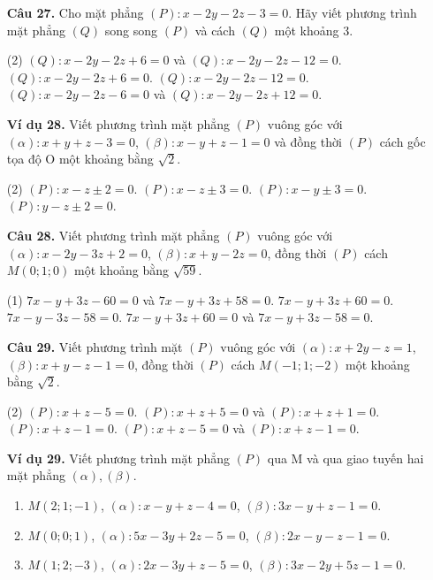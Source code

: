 \documentclass[12pt, a4paper]{article}
\begin{document}
\begin{enumerate}[label=\textbf{\arabic*.}, wide=0pt, leftmargin=*]
    \item[\textbf{Câu 27.}] Cho mặt phẳng \((P): x-2y-2z-3=0\). Hãy viết phương trình mặt phẳng \((Q)\) song song \((P)\) và cách \((Q)\) một khoảng 3.
    \begin{tasks}(2)
        \task \((Q): x-2y-2z+6=0\) và \((Q): x-2y-2z-12=0\).
        \task \((Q): x-2y-2z+6=0\).
        \task \((Q): x-2y-2z-12=0\).
        \task \((Q): x-2y-2z-6=0\) và \((Q): x-2y-2z+12=0\).
    \end{tasks}
    
    \item[\textbf{Ví dụ 28.}] Viết phương trình mặt phẳng \((P)\) vuông góc với \((\alpha): x+y+z-3=0\), \((\beta): x-y+z-1=0\) và đồng thời \((P)\) cách gốc tọa độ O một khoảng bằng \(\sqrt{2}\).
    \begin{tasks}(2)
        \task \((P): x-z \pm 2 = 0\).
        \task \((P): x-z \pm 3 = 0\).
        \task \((P): x-y \pm 3 = 0\).
        \task \((P): y-z \pm 2 = 0\).
    \end{tasks}
    
    \item[\textbf{Câu 28.}] Viết phương trình mặt phẳng \((P)\) vuông góc với \((\alpha): x-2y-3z+2=0\), \((\beta): x+y-2z=0\), đồng thời \((P)\) cách \(M(0;1;0)\) một khoảng bằng \(\sqrt{59}\).
    \begin{tasks}[label-width=1.5em](1)
        \task \(7x-y+3z-60=0\) và \(7x-y+3z+58=0\).
        \task \(7x-y+3z+60=0\).
        \task \(7x-y-3z-58=0\).
        \task \(7x-y+3z+60=0\) và \(7x-y+3z-58=0\).
    \end{tasks}
    
    
    \item[\textbf{Câu 29.}] Viết phương trình mặt \((P)\) vuông góc với \((\alpha): x+2y-z=1\), \((\beta): x+y-z-1=0\), đồng thời \((P)\) cách \(M(-1;1;-2)\) một khoảng bằng \(\sqrt{2}\).
    \begin{tasks}(2)
        \task \((P): x+z-5=0\).
        \task \((P): x+z+5=0\) và \((P): x+z+1=0\).
        \task \((P): x+z-1=0\).
        \task \((P): x+z-5=0\) và \((P): x+z-1=0\).
    \end{tasks}

    \item[\textbf{Ví dụ 29.}] Viết phương trình mặt phẳng \((P)\) qua M và qua giao tuyến hai mặt phẳng \((\alpha), (\beta)\).
    \begin{enumerate}[label=\alph*)]
        \item \(M(2;1;-1)\), \((\alpha): x-y+z-4=0\), \((\beta): 3x-y+z-1=0\).
        \item \(M(0;0;1)\), \((\alpha): 5x-3y+2z-5=0\), \((\beta): 2x-y-z-1=0\).
        \item \(M(1;2;-3)\), \((\alpha): 2x-3y+z-5=0\), \((\beta): 3x-2y+5z-1=0\).
    \end{enumerate}


\end{enumerate}
\end{document}
